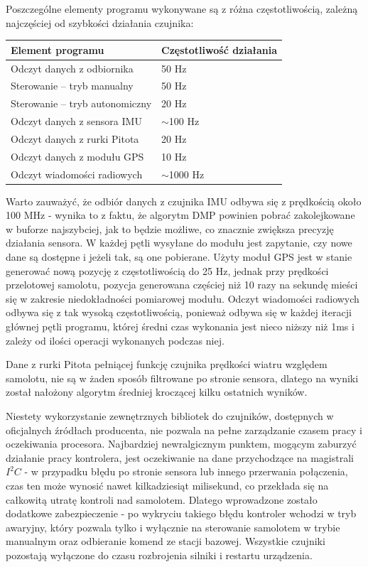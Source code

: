 \documentclass[12pt, a4paper]{article}
\begin{document}
Poszczególne elementy programu wykonywane są z różna częstotliwością, zależną najczęściej od szybkości działania czujnika:

\begin{center}

\begin{tabular}{| l | l |}
\hline
Element programu & Częstotliwość działania \\
\hline
Odczyt danych z odbiornika & 50 Hz \\
Sterowanie – tryb manualny & 50 Hz \\
Sterowanie – tryb autonomiczny & 20 Hz \\
Odczyt danych z sensora IMU & $\sim$100 Hz \\
Odczyt danych z rurki Pitota & 20 Hz \\
Odczyt danych z modułu GPS & 10 Hz \\
Odczyt wiadomości radiowych & $\sim$1000 Hz \\
\hline

\end{tabular}

\end{center}

Warto zauważyć, że odbiór danych z czujnika IMU odbywa się z prędkością około 100 MHz - wynika to z faktu, że algorytm DMP powinien pobrać zakolejkowane w buforze najszybciej, jak to będzie możliwe, co znacznie zwiększa precyzję działania sensora. W każdej pętli wysyłane do modułu jest zapytanie, czy nowe dane są dostępne i jeżeli tak, są one pobierane. Użyty moduł GPS jest w stanie generować nową pozycję z częstotliwością do 25 Hz, jednak przy prędkości przelotowej samolotu, pozycja generowana częściej niż 10 razy na sekundę mieści się w zakresie niedokładności pomiarowej modułu. Odczyt wiadomości radiowych odbywa się z tak wysoką częstotliwością, ponieważ odbywa się w każdej iteracji głównej pętli programu, której średni czas wykonania jest nieco niższy niż 1ms i zależy od ilości operacji wykonanych podczas niej.


Dane z rurki Pitota pełniącej funkcję czujnika prędkości wiatru względem samolotu, nie są w żaden sposób filtrowane po stronie sensora, dlatego na wyniki został nałożony algorytm średniej kroczącej kilku ostatnich wyników.

Niestety wykorzystanie zewnętrznych bibliotek do czujników, dostępnych w oficjalnych źródłach producenta, nie pozwala na pełne zarządzanie czasem pracy i oczekiwania procesora. Najbardziej newralgicznym punktem, mogącym zaburzyć działanie pracy kontrolera, jest oczekiwanie na dane przychodzące na magistrali $I^2C$ - w przypadku błędu po stronie sensora lub innego przerwania połączenia, czas ten może wynosić nawet kilkadziesiąt milisekund, co przekłada się na całkowitą utratę kontroli nad samolotem. Dlatego wprowadzone zostało dodatkowe zabezpieczenie - po wykryciu takiego błędu kontroler wchodzi w tryb awaryjny, który pozwala tylko i wyłącznie na sterowanie samolotem w trybie manualnym oraz odbieranie komend ze stacji bazowej. Wszystkie czujniki pozostają wyłączone do czasu rozbrojenia silniki i restartu urządzenia.
\end{document}
